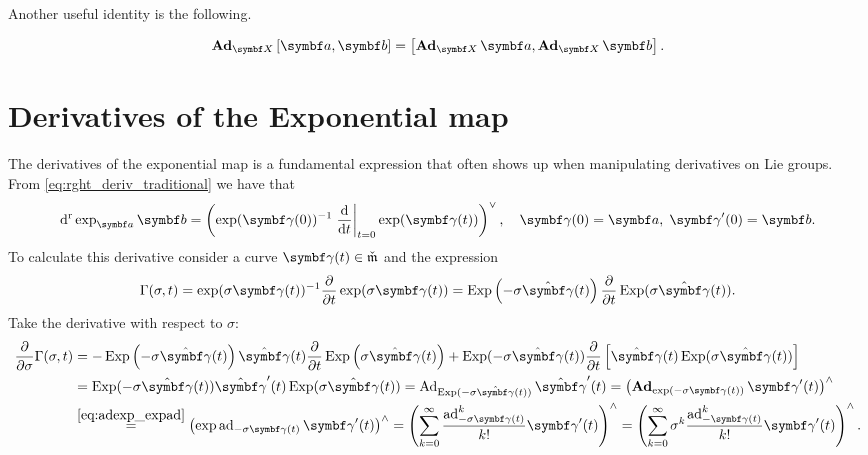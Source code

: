 Another useful identity is the following.
\begin{important}
  \begin{equation}
    \bAd_\X \left[ \a, \b \right] = \left[ \bAd_\X \a, \bAd_\X \b \right].
  \end{equation}
\end{important}
\section{Derivatives of the Exponential map}

The derivatives of the exponential map is a fundamental expression that often shows up when manipulating derivatives on Lie groups. From \eqref{eq:rght_deriv_traditional} we have that
\begin{equation}
  \dr \exp_\a \b = \left( \exp(\bgamma(0))^{-1} \left. \frac{\mathrm{d}}{\mathrm{d}t}\right|_{t = 0} \exp(\bgamma(t)) \right)^\vee, \quad \bgamma(0) = \a, \; \bgamma'(0) = \b.
\end{equation}
To calculate this derivative consider a curve $\bgamma(t) \in \check{\mathfrak{m}}$ and the expression
\begin{equation}
  \label{eq:exponential_derivative_posit}
  \Gamma(\sigma, t) = \exp(\sigma \bgamma(t))^{-1} \frac{\partial}{\partial t}  \exp(\sigma \bgamma(t)) = \Exp \left( - \sigma \hat \bgamma(t) \right) \frac{\partial}{\partial t}  \Exp(\sigma \hat \bgamma(t)).
\end{equation}
Take the derivative with respect to $\sigma$:
\begin{equation}
  \begin{aligned}
    \frac{\partial}{\partial \sigma} \Gamma(\sigma, t)
     & = -\Exp \left(-\sigma \hat \bgamma(t) \right) \hat \bgamma(t) \frac{\partial}{\partial t} \Exp \left(\sigma \hat \bgamma(t) \right) + \Exp(-\sigma \hat \bgamma(t)) \frac{\partial}{ \partial t} \left[ \hat \bgamma(t) \Exp (\sigma \hat \bgamma(t)) \right]                             \\
     & = \Exp(-\sigma \hat \bgamma(t)) \hat \bgamma'(t) \Exp(\sigma \hat \bgamma(t)) = \Ad_{\Exp (- \sigma \hat \bgamma(t))}\hat \bgamma'(t) = \left(
    \bAd_{\exp(-\sigma \bgamma(t))} \bgamma'(t) \right)^\wedge                                                                                                                                                                                                                                   \\
     & \overset{\eqref{eq:adexp_expad}}= \left( \exp \ad_{-\sigma \bgamma(t)}\bgamma'(t) \right)^\wedge = \left( \sum_{k=0}^\infty \frac{\ad^k_{-\sigma \bgamma(t)}}{k!}\bgamma'(t) \right)^\wedge = \left( \sum_{k=0}^\infty \sigma^k \frac{\ad^k_{-\bgamma(t)}}{k!}\bgamma'(t) \right)^\wedge.
  \end{aligned}
\end{equation}
